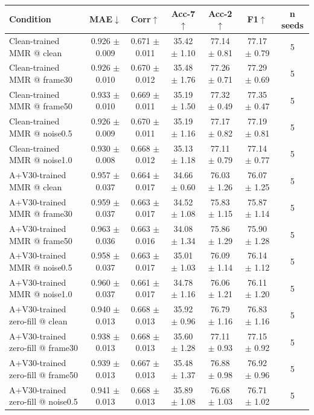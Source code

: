 \begin{tabular}{lcccccc}
\hline
Condition & MAE$\downarrow$ & Corr$\uparrow$ & Acc-7$\uparrow$ & Acc-2$\uparrow$ & F1$\uparrow$ & n seeds \\
\hline
Clean-trained MMR @ clean & 0.926 $\pm$ 0.009 & 0.671 $\pm$ 0.011 & 35.42 $\pm$ 1.10 & 77.14 $\pm$ 0.81 & 77.17 $\pm$ 0.79 & 5 \\
Clean-trained MMR @ frame30 & 0.926 $\pm$ 0.010 & 0.670 $\pm$ 0.012 & 35.48 $\pm$ 1.76 & 77.26 $\pm$ 0.71 & 77.29 $\pm$ 0.69 & 5 \\
Clean-trained MMR @ frame50 & 0.933 $\pm$ 0.010 & 0.669 $\pm$ 0.011 & 35.19 $\pm$ 1.50 & 77.32 $\pm$ 0.49 & 77.35 $\pm$ 0.47 & 5 \\
Clean-trained MMR @ noise0.5 & 0.926 $\pm$ 0.009 & 0.670 $\pm$ 0.011 & 35.19 $\pm$ 1.16 & 77.17 $\pm$ 0.82 & 77.19 $\pm$ 0.81 & 5 \\
Clean-trained MMR @ noise1.0 & 0.930 $\pm$ 0.008 & 0.668 $\pm$ 0.012 & 35.13 $\pm$ 1.18 & 77.11 $\pm$ 0.79 & 77.14 $\pm$ 0.77 & 5 \\
A+V30-trained MMR @ clean & 0.957 $\pm$ 0.037 & 0.664 $\pm$ 0.017 & 34.66 $\pm$ 0.60 & 76.03 $\pm$ 1.26 & 76.07 $\pm$ 1.25 & 5 \\
A+V30-trained MMR @ frame30 & 0.959 $\pm$ 0.037 & 0.663 $\pm$ 0.017 & 34.52 $\pm$ 1.08 & 75.83 $\pm$ 1.15 & 75.87 $\pm$ 1.14 & 5 \\
A+V30-trained MMR @ frame50 & 0.963 $\pm$ 0.036 & 0.663 $\pm$ 0.016 & 34.08 $\pm$ 1.34 & 75.86 $\pm$ 1.29 & 75.90 $\pm$ 1.28 & 5 \\
A+V30-trained MMR @ noise0.5 & 0.958 $\pm$ 0.037 & 0.663 $\pm$ 0.017 & 35.01 $\pm$ 1.03 & 76.09 $\pm$ 1.14 & 76.14 $\pm$ 1.12 & 5 \\
A+V30-trained MMR @ noise1.0 & 0.960 $\pm$ 0.037 & 0.661 $\pm$ 0.017 & 34.78 $\pm$ 1.16 & 76.06 $\pm$ 1.21 & 76.11 $\pm$ 1.20 & 5 \\
A+V30-trained zero-fill @ clean & 0.940 $\pm$ 0.013 & 0.668 $\pm$ 0.013 & 35.92 $\pm$ 0.96 & 76.79 $\pm$ 1.16 & 76.83 $\pm$ 1.16 & 5 \\
A+V30-trained zero-fill @ frame30 & 0.938 $\pm$ 0.013 & 0.668 $\pm$ 0.013 & 35.60 $\pm$ 1.28 & 77.11 $\pm$ 0.93 & 77.15 $\pm$ 0.92 & 5 \\
A+V30-trained zero-fill @ frame50 & 0.939 $\pm$ 0.013 & 0.667 $\pm$ 0.013 & 35.48 $\pm$ 1.37 & 76.88 $\pm$ 0.98 & 76.92 $\pm$ 0.96 & 5 \\
A+V30-trained zero-fill @ noise0.5 & 0.941 $\pm$ 0.013 & 0.668 $\pm$ 0.013 & 35.89 $\pm$ 1.08 & 76.68 $\pm$ 1.03 & 76.71 $\pm$ 1.02 & 5 \\

\end{tabular}
